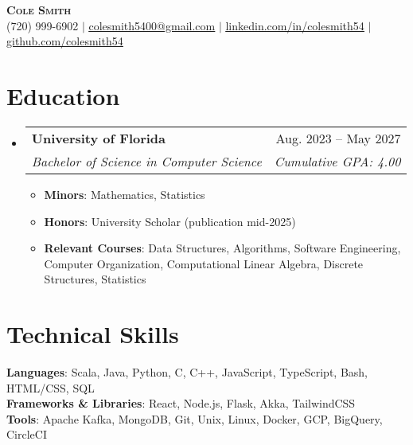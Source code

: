 \documentclass[letterpaper,12pt]{article}
\makeatletter
\newcommand{\resumeItem}[1]{
  \item\small{
    {#1 \vspace{-2pt}}
  }
}
\newcommand{\resumeSubheading}[4]{
  \vspace{-2pt}\item
    \begin{tabular*}{0.97\textwidth}[t]{l@{\extracolsep{\fill}}r}
      \textbf{#1} & #2 \\
      \textit{\small#3} & \textit{\small #4} \\
    \end{tabular*}\vspace{-7pt}
}
\newcommand{\resumeSubHeadingListStart}{\begin{itemize}[leftmargin=0.15in, label={}]}
\newcommand{\resumeSubHeadingListEnd}{\end{itemize}}
\newcommand{\resumeItemListStart}{\begin{itemize}}
\newcommand{\resumeItemListEnd}{\end{itemize}\vspace{-5pt}}
\makeatother
\begin{document}
\begin{center}
    \textbf{\Huge \scshape Cole Smith} \\ \vspace{1pt}
    \small (720) 999-6902 $|$ \href{mailto:colesmith5400@gmail.com}{\underline{colesmith5400@gmail.com}} $|$ 
    \href{https://linkedin.com/in/colesmith54}{\underline{linkedin.com/in/colesmith54}} $|$
    \href{https://github.com/colesmith54}{\underline{github.com/colesmith54}}
\end{center}


\section{Education}
  \resumeSubHeadingListStart
    \resumeSubheading
      {University of Florida}{Aug. 2023 -- May 2027}
      {Bachelor of Science in Computer Science}{Cumulative GPA: 4.00}
      \resumeItemListStart
        \resumeItem{\textbf{Minors}: Mathematics, Statistics}
        \resumeItem{\textbf{Honors}: {University Scholar (publication mid-2025)}}
        \resumeItem{\textbf{Relevant Courses}: Data Structures, Algorithms, Software Engineering, Computer Organization, Computational Linear Algebra, Discrete Structures, Statistics}
      \resumeItemListEnd
  \resumeSubHeadingListEnd

\section{Technical Skills}
 \begin{itemize}[leftmargin=0.15in, label={}]
    \small{\item{
     \textbf{Languages}{: Scala, Java, Python, C, C++, JavaScript, TypeScript, Bash, HTML/CSS, SQL} \\
     \textbf{Frameworks \& Libraries}{: React, Node.js, Flask, Akka, TailwindCSS} \\
     \textbf{Tools}{: Apache Kafka, MongoDB, Git, Unix, Linux, Docker, GCP, BigQuery, CircleCI} \\
    }}
 \end{itemize}
\end{document}
